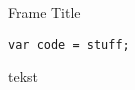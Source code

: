 \documentclass[compressed, presentation,notheorems]{beamer}
\begin{document}
	\begin{frame}[fragile]{Frame Title}
	\begin{lstlisting}[caption=Overskrift på boks, style=Code-C++, label=lst:referenceLabel]
	var code = stuff;
	\end{lstlisting}
	\end{frame}

	\begin{frame}[fragile]
	tekst

	\end{frame}
\end{document}
